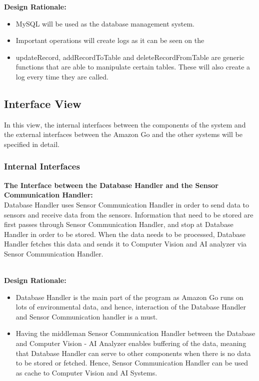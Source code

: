 \documentclass[11pt]{article}
\begin{document}
    \textbf{Design Rationale:\\}
    \begin{itemize}
        \item MySQL will be used as the database management system.
        \item Important operations will create logs as it can be seen on the 
        \item updateRecord, addRecordToTable and deleteRecordFromTable are generic functions that are able to manipulate certain tables. These will also create a log every time they are called.
    \end{itemize}


    \subsection{Interface View}
    In this view, the internal interfaces between the components of the system and the external interfaces between the 
    Amazon Go and the other systems will be specified in detail.

    
    \subsubsection{Internal Interfaces}
    \textbf{The Interface between the Database Handler and the Sensor Communication Handler:\\}
    Database Handler uses Sensor Communication Handler in order to send data to sensors and receive data from the sensors. Information that need to be stored are first passes
    through Sensor Communication Handler, and stop at Database Handler in order to be stored. When the data needs to be processed, Database Handler fetches this data
    and sends it to Computer Vision and AI analyzer via Sensor Communication Handler. 
    
    \textbf{\\Design Rationale:}
    \begin{itemize}
        \item  Database Handler is the main part of the program as Amazon Go runs on lots of environmental data, and hence, interaction of the Database Handler and
        Sensor Communication handler is a must.
        \item Having the middleman Sensor Communication Handler between the Database and Computer Vision - AI Analyzer enables buffering of the data, meaning that 
            Database Handler can serve to other components when there is no data to be stored or fetched. Hence, Sensor Communication Handler can be used as cache to Computer
            Vision and AI Systems.
    \end{itemize}
    
\end{document}
